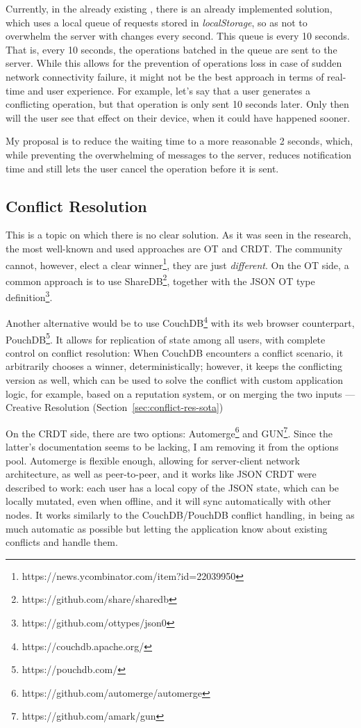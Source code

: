 Currently, in the already existing , there is an already implemented solution, which uses a local queue of requests stored in \textit{localStorage}, so as not to overwhelm the server with changes every second. This queue is  every 10 seconds. That is, every 10 seconds, the operations batched in the queue are sent to the server. While this allows for the prevention of operations loss in case of sudden network connectivity failure, it might not be the best approach in terms of real-time and user experience. For example, let's say that a user generates a conflicting operation, but that operation is only sent 10 seconds later. Only then will the user see that effect on their device, when it could have happened sooner.

My proposal is to reduce the waiting time to a more reasonable 2 seconds, which, while preventing the overwhelming of messages to the server, reduces notification time and still lets the user cancel the operation before it is sent.

\subsection{Conflict Resolution} \label{sec:prob-solution-conflict-res}
This is a topic on which there is no clear solution. As it was seen in the research, the most well-known and used approaches are OT and CRDT. The community cannot, however, elect a clear winner\footnote{https://news.ycombinator.com/item?id=22039950}, they are just \textit{different}. On the OT side, a common approach is to use ShareDB\footnote{https://github.com/share/sharedb}, together with the JSON OT type definition\footnote{https://github.com/ottypes/json0}.

Another alternative would be to use CouchDB\footnote{https://couchdb.apache.org/} with its web browser counterpart, PouchDB\footnote{https://pouchdb.com/}. It allows for replication of state among all users, with complete control on conflict resolution: When CouchDB encounters a conflict scenario, it arbitrarily chooses a winner, deterministically; however, it keeps the conflicting version as well, which can be used to solve the conflict with custom application logic, for example, based on a reputation system, or on merging the two inputs --- Creative Resolution (Section~\ref{sec:conflict-res-sota})

On the CRDT side, there are two options: Automerge\footnote{https://github.com/automerge/automerge} and GUN\footnote{https://github.com/amark/gun}. Since the latter's documentation seems to be lacking, I am removing it from the options pool. Automerge is flexible enough, allowing for server-client network architecture, as well as peer-to-peer, and it works like JSON CRDT were described to work: each user has a local copy of the JSON state, which can be locally mutated, even when offline, and it will sync automatically with other nodes. It works similarly to the CouchDB/PouchDB conflict handling, in being as much automatic as possible but letting the application know about existing conflicts and handle them.

